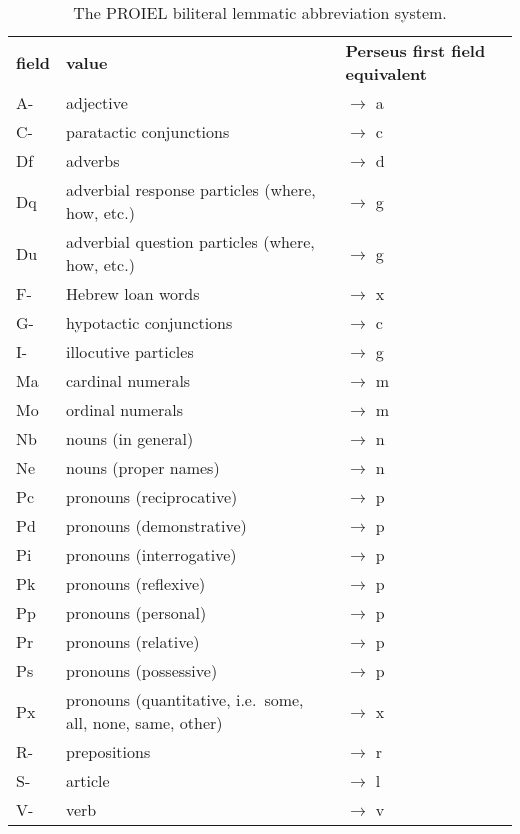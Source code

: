 \begin{table}
  \begin{tabular}{|l|l|l|}
        \hline
        \textbf{field}            & \textbf{value} & \textbf{Perseus first field equivalent} \\ \thickhline
                                A- & adjective & $\rightarrow$ a \\ \hline
                                C- & paratactic conjunctions & $\rightarrow$ c \\ \hline
                                Df & adverbs & $\rightarrow$ d \\
                                Dq & adverbial response particles (where, how, etc.) & $\rightarrow$ g \\
                                Du & adverbial question particles (where, how, etc.)  & $\rightarrow$ g \\ \hline
                                F- & Hebrew loan words & $\rightarrow$ x \\ \hline
                                G- & hypotactic conjunctions & $\rightarrow$ c \\ \hline
                                I- & illocutive particles & $\rightarrow$ g \\ \hline
                                Ma & cardinal numerals & $\rightarrow$ m \\
                                Mo & ordinal numerals & $\rightarrow$ m \\ \hline
                                Nb & nouns (in general) & $\rightarrow$ n \\
                                Ne & nouns (proper names) & $\rightarrow$ n \\ \hline
                                Pc & pronouns (reciprocative) & $\rightarrow$ p \\
                                Pd & pronouns (demonstrative) & $\rightarrow$ p \\
                                Pi & pronouns (interrogative) & $\rightarrow$ p \\
                                Pk & pronouns (reflexive) & $\rightarrow$ p \\
                                Pp & pronouns (personal) & $\rightarrow$ p \\
                                Pr & pronouns (relative) & $\rightarrow$ p \\
                                Ps & pronouns (possessive) & $\rightarrow$ p \\
                                Px & pronouns (quantitative, i.e.\ some, all, none, same, other) & $\rightarrow$ x \\ \hline
                                R- & prepositions & $\rightarrow$ r \\ \hline
                                S- & article & $\rightarrow$ l \\ \hline
                                V- & verb & $\rightarrow$ v \\ \hline
        \hline
    \end{tabular}
\caption{The PROIEL biliteral lemmatic abbreviation system.} \label{table:proiellemmata}
\end{table}

